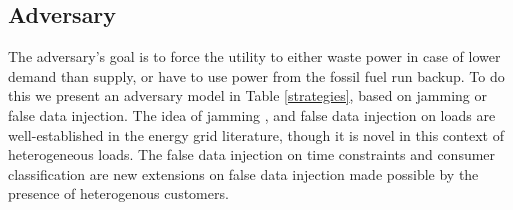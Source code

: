 \documentclass[conference]{IEEEtran}
\begin{document}
\subsection{Adversary}
\label{Adversary}

The adversary's goal is to force the utility to either waste power in case of lower demand than supply, or have to use power from the fossil fuel run backup. To do this we present an adversary model in Table \ref{strategies}, based on jamming or false data injection. The idea of jamming \cite{gupta2010optimal}, and false data injection on loads \cite{lin2012false}\cite{yuan2011modeling} are well-established in the energy grid literature, though it is novel in this context of heterogeneous loads. The false data injection on time constraints and consumer classification are new extensions on false data injection made possible by the presence of heterogenous customers.
\end{document}
